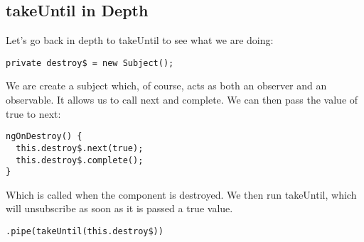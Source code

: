 \subsection{takeUntil in Depth}

Let's go back in depth to takeUntil to see what we are doing:
\begin{verbatim}
private destroy$ = new Subject();
\end{verbatim}
We are create a subject which, of course, acts as both an observer and an
observable. It allows us to call next and complete. We can then pass the value
of true to next:

\begin{verbatim}
ngOnDestroy() {
  this.destroy$.next(true);
  this.destroy$.complete();
}
\end{verbatim}
Which is called when the component is destroyed. We then run takeUntil, which
will unsubscribe as soon as it is passed a true value.
\begin{verbatim}
.pipe(takeUntil(this.destroy$))
\end{verbatim}
